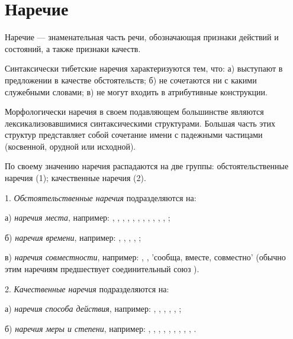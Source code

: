 \section{Наречие}

Наречие --- знаменательная часть речи, обозначающая признаки действий и состояний, а также признаки качеств.

Синтаксически тибетские наречия характеризуются тем, что: а) выступают в предложении в качестве обстоятельств; б) не сочетаются ни с какими служебными словами; в) не могут входить в атрибутивные конструкции.

Морфологически наречия в своем подавляющем большинстве являются лексикализовавшимися синтаксическими структурами. Большая часть этих структур представляет собой сочетание имени с падежными частицами (косвенной, орудной или исходной).

По своему значению наречия распадаются на две группы: обстоятельственные наречия (1); качественные наречия (2).

1. \emph{Обстоятельственные наречия} подразделяются на:

а) \emph{наречия места}, например:
,
,
,
,
,
,
,
,
,
,
,
;

б) \emph{наречия времени}, например:
,
,
,
,
;

в) \emph{наречия совместности}, например:
, ,  'сообща, вместе, совместно' (обычно этим наречиям предшествует соединительный союз ).

2. \emph{Качественные наречия} подразделяются на:

а) \emph{наречия способа действия}, например:
,
,
,
,
,
;

б) \emph{наречия меры и степени}, например:
,
,
,
,
,
,
,
,
,
.



